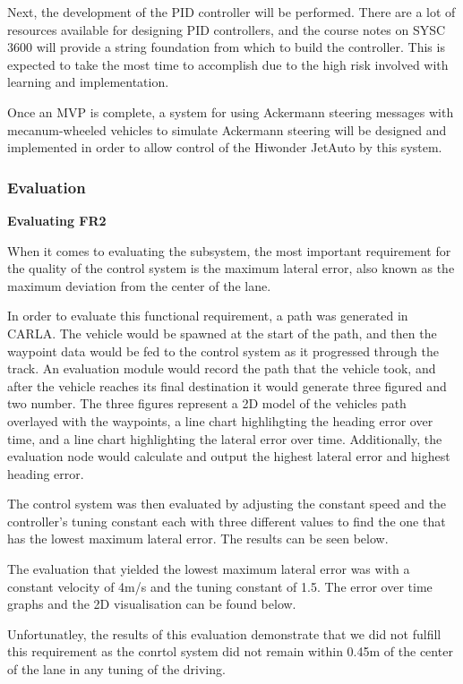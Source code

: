\documentclass[titlepage]{article}
\begin{document}
Next, the development of the PID controller will be performed. There are a lot of resources available for designing PID controllers, and the course notes on SYSC 3600 will provide a string foundation from which to build the controller. This is expected to take the most time to accomplish due to the high risk involved with learning and implementation.

Once an MVP is complete, a system for using Ackermann steering messages with mecanum-wheeled vehicles to simulate Ackermann steering will be designed and implemented in order to allow control of the Hiwonder JetAuto by this system.

\subsubsection{Evaluation}
\textbf{Evaluating FR2}

When it comes to evaluating the subsystem, the most important requirement for the quality of the control system is the maximum lateral error, also known as the maximum deviation from the center of the lane.

In order to evaluate this functional requirement, a path was generated in CARLA. The vehicle would be spawned at the start of the path, and then the waypoint data would be fed to the control system as it progressed through the track. An evaluation module would record the path that the vehicle took, and after the vehicle reaches its final destination it would generate three figured and two number. The three figures represent a 2D model of the vehicles path overlayed with the waypoints, a line chart highlihgting the heading error over time, and a line chart highlighting the lateral error over time. Additionally, the evaluation node would calculate and output the highest lateral error and highest heading error.

The control system was then evaluated by adjusting the constant speed and the controller's tuning constant each with three different values to find the one that has the lowest maximum lateral error. The results can be seen below.


The evaluation that yielded the lowest maximum lateral error was with a constant velocity of 4m/s and the tuning constant of 1.5. The error over time graphs and the 2D visualisation can be found below.


Unfortunatley, the results of this evaluation demonstrate that we did not fulfill this requirement as the conrtol system did not remain within 0.45m of the center of the lane in any tuning of the driving.
\end{document}
